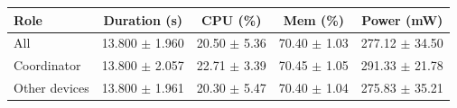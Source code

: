 \begin{tabular}{lcccc}
\hline
\textbf{Role} & \textbf{Duration (s)} & \textbf{CPU (\%)} & \textbf{Mem (\%)} & \textbf{Power (mW)} \\
\hline
All & 13.800 $\pm$ 1.960 & 20.50 $\pm$ 5.36 & 70.40 $\pm$ 1.03 & 277.12 $\pm$ 34.50 \\
Coordinator & 13.800 $\pm$ 2.057 & 22.71 $\pm$ 3.39 & 70.45 $\pm$ 1.05 & 291.33 $\pm$ 21.78 \\
Other devices & 13.800 $\pm$ 1.961 & 20.30 $\pm$ 5.47 & 70.40 $\pm$ 1.04 & 275.83 $\pm$ 35.21 \\
\hline
\end{tabular}
